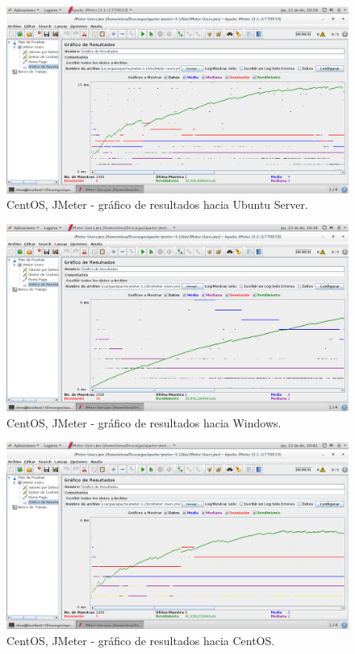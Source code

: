 \begin{figure}[H] 
	\centering
	\includegraphics[width=14.7cm]{./img/ejercicio4_11.png} 	
	\caption{CentOS, JMeter - gráfico de resultados hacia Ubuntu Server.} \label{fig:ejercicio4_11}
\end{figure}

\begin{figure}[H] 
	\centering
	\includegraphics[width=14.7cm]{./img/ejercicio4_12.png} 	
	\caption{CentOS, JMeter - gráfico de resultados hacia Windows.} \label{fig:ejercicio4_12}
\end{figure}

\begin{figure}[H] 
	\centering
	\includegraphics[width=14.7cm]{./img/ejercicio4_13.png} 	
	\caption{CentOS, JMeter - gráfico de resultados hacia CentOS.} \label{fig:ejercicio4_13}
\end{figure}



